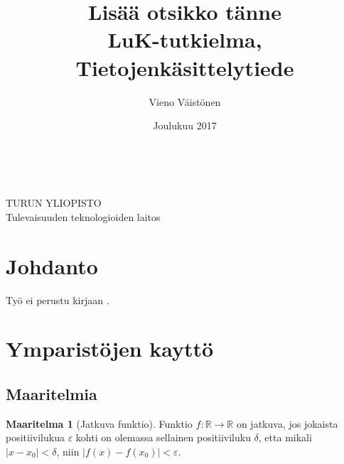 \documentclass[12pt, titlepage]{article}
\title{Lisää otsikko tänne \\ {\normalsize
LuK-tutkielma, Tietojenkäsittelytiede}}
\author{Vieno Väistönen}
\date{Joulukuu 2017}
\makeatletter
\theoremstyle{definition}
\newtheorem{maar}{Maaritelma}[section] %
\newcommand{\R}{\mathbb{R}}
\newcommand{\abs}[1]{\vert #1 \vert} %
\let\inserttitle\@title
\let\insertauthor\@author
\let\insertdate\@date
\makeatother
\begin{document}

\pagestyle{empty} %

\vspace*{\fill} %
\begin{center}\Large %
\inserttitle
\end{center}

\vspace{0.3cm}
\begin{center}
\insertauthor \\
\insertdate
\end{center}

\vfill %
\begin{center}
TURUN YLIOPISTO\\
Tulevaisuuden teknologioiden laitos\\
\end{center}

\begin{center}
\end{center}

\newpage %
\tableofcontents %

\newpage

\pagestyle{plain}
\setcounter{page}{1}

\section{Johdanto}

Työ ei perustu kirjaan \cite{latexcompanion}.

\section{Ymparistöjen kayttö}

\subsection{Maaritelmia}
\begin{maar}[Jatkuva funktio] Funktio $f:\R \rightarrow \R$ on jatkuva, jos jokaista positiivilukua $\varepsilon$ kohti on olemassa sellainen
positiiviluku $\delta$, etta mikali $\abs{x-x_0} <\delta $, niin $\abs{f(x)-f(x_0)}<\varepsilon.$
\end{maar}
\end{document}

